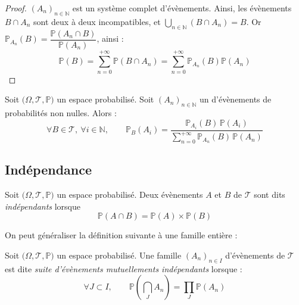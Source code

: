 \documentclass[11pt,a4paper,fleqn,pdftex]{report}
\begin{document}
\begin{proof}
     $(A_n)_{n\in\mathbb{N}}$ est un système complet d'évènements. Ainsi, les évènements $B\cap A_n$ sont deux à deux incompatibles, et $\bigcup_{n\in\mathbb{N}} \left( B\cap A_n\right) = B$. Or $\mathbb{P}_{A_n}(B) = \dfrac{\mathbb{P}(A_n\cap B)}{\mathbb{P}(A_n)}$, ainsi : 
     \[
         \mathbb{P}(B) = \sum_{n=0}^{+\infty} \mathbb{P} \left( B\cap A_n \right)
                       = \sum_{n=0}^{+\infty} \mathbb{P}_{A_n}(B) \mathbb{P}(A_n)
     \]
\end{proof}
\begin{itheorem}
     Soit $\big( \Omega , \mathscr{T}, \mathbb{P} \big)$ un espace probabilisé. \newline
     Soit $(A_n)_{n\in\mathbb{N}}$ un  d'évènements de probabilités non nulles. Alors :
     \begin{equation}
     \forall B\in \mathscr{T},\: \forall i\in \mathbb{N},\qquad \mathbb{P}_B(A_i) = \dfrac{\mathbb{P}_{A_i}(B)\,\mathbb{P}(A_i)}{\displaystyle\sum_{n=0}^{+\infty}\mathbb{P}_{A_n} (B)\, \mathbb{P}(A_n)}
     \end{equation}
\end{itheorem}
\subsection{Indépendance} %
\label{sub:independance}
\begin{dfn}
     Soit $\big( \Omega , \mathscr{T}, \mathbb{P} \big)$ un espace probabilisé. \newline
     Deux évènements $A$ et $B$ de $\mathscr{T}$ sont dits \emph{indépendants} lorsque 
     \begin{equation}
     \mathbb{P}(A\cap B) = \mathbb{P}(A)\times \mathbb{P}(B)
     \end{equation}
\end{dfn}
On peut généraliser la définition suivante à une famille entière :
\begin{dfn}
     Soit $\big( \Omega , \mathscr{T}, \mathbb{P} \big)$ un espace probabilisé. \newline
     Une famille $(A_n)_{n\in I}$  d'évènements de $\mathscr{T}$ est dite \emph{suite d'évènements mutuellements indépendants} lorsque :
     \begin{equation}
     \forall J\subset I,\qquad \mathbb{P} \left( \bigcap_J A_n \right) = \prod_J \mathbb{P} (A_n)
     \end{equation}
\end{dfn}
\end{document}
